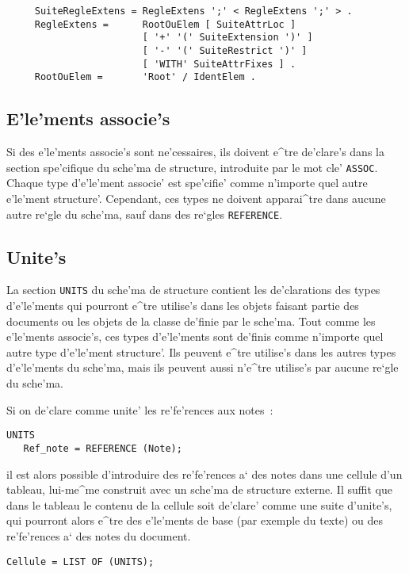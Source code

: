 {\begin{verbatim}
     SuiteRegleExtens = RegleExtens ';' < RegleExtens ';' > .
     RegleExtens =      RootOuElem [ SuiteAttrLoc ]
                        [ '+' '(' SuiteExtension ')' ]
                        [ '-' '(' SuiteRestrict ')' ]
                        [ 'WITH' SuiteAttrFixes ] .
     RootOuElem =       'Root' / IdentElem .
\end{verbatim}

\subsection{E'le'ments associe's}

Si des e'le'ments associe's sont ne'cessaires, ils doivent e^tre de'clare's
dans la section spe'cifique du sche'ma de structure, introduite par le mot cle' 
{\tt ASSOC}. Chaque type d'e'le'ment associe' est spe'cifie' comme n'importe
quel autre e'le'ment structure'. Cependant, ces types ne doivent apparai^tre
dans aucune autre re`gle du sche'ma, sauf dans des re`gles {\tt REFERENCE}.

\subsection{Unite's}
\label{uniteslog}

La section {\tt UNITS} du sche'ma de structure contient les de'clarations des
types d'e'le'ments qui pourront e^tre utilise's dans les objets faisant partie
des documents ou les objets de la classe de'finie par le sche'ma. Tout comme
les e'le'ments associe's, ces types d'e'le'ments sont de'finis comme n'importe
quel autre type d'e'le'ment structure'. Ils peuvent e^tre utilise's dans les
autres types d'e'le'ments du sche'ma, mais ils peuvent aussi n'e^tre utilise's
par aucune re`gle du sche'ma.

\begin{example}
Si on de'clare comme unite' les re'fe'rences aux notes~:
\begin{verbatim}
UNITS
   Ref_note = REFERENCE (Note);
\end{verbatim}
il est alors possible d'introduire des re'fe'rences a` des notes dans une cellule
d'un tableau, lui-me^me construit avec un sche'ma de structure externe. Il
suffit que dans le tableau le contenu de la cellule soit de'clare' comme
une suite d'unite's, qui pourront alors e^tre des e'le'ments de base (par
exemple du texte) ou des re'fe'rences a` des notes du document.
\begin{verbatim}
Cellule = LIST OF (UNITS);
\end{verbatim}
\end{example}

}
